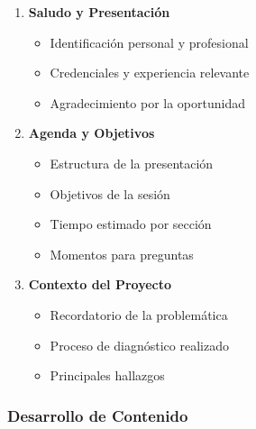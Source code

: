 \documentclass[12pt,letterpaper,oneside]{book}
\begin{document}
\begin{enumerate}
\item \textbf{Saludo y Presentación}
   \begin{itemize}
   \item Identificación personal y profesional
   \item Credenciales y experiencia relevante
   \item Agradecimiento por la oportunidad
   \end{itemize}

\item \textbf{Agenda y Objetivos}
   \begin{itemize}
   \item Estructura de la presentación
   \item Objetivos de la sesión
   \item Tiempo estimado por sección
   \item Momentos para preguntas
   \end{itemize}

\item \textbf{Contexto del Proyecto}
   \begin{itemize}
   \item Recordatorio de la problemática
   \item Proceso de diagnóstico realizado
   \item Principales hallazgos
   \end{itemize}
\end{enumerate}

\subsubsection{Desarrollo de Contenido}
\end{document}
